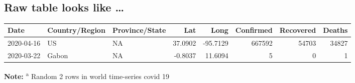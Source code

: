\documentclass[
  11pt,
]{article}
\begin{document}
~

\hypertarget{raw-table-looks-like}{%
\subsection{Raw table looks like \ldots{}}\label{raw-table-looks-like}}

\begin{longtable}[]{@{}lllrrrrr@{}}
\toprule
Date & Country/Region & Province/State & Lat & Long & Confirmed &
Recovered & Deaths\tabularnewline
\midrule
\endhead
2020-04-16 & US & NA & 37.0902 & -95.7129 & 667592 & 54703 &
34827\tabularnewline
2020-03-22 & Gabon & NA & -0.8037 & 11.6094 & 5 & 0 & 1\tabularnewline
\bottomrule
\end{longtable}

\textbf{Note:} \textsuperscript{a} Random 2 rows in world time-series
covid 19
\end{document}
